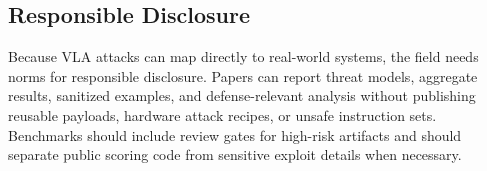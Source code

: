 \subsection{Responsible Disclosure}

Because VLA attacks can map directly to real-world systems, the field needs norms for responsible disclosure. Papers can report threat models, aggregate results, sanitized examples, and defense-relevant analysis without publishing reusable payloads, hardware attack recipes, or unsafe instruction sets. Benchmarks should include review gates for high-risk artifacts and should separate public scoring code from sensitive exploit details when necessary.
